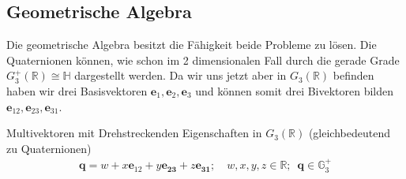 \subsection{Geometrische Algebra}
Die geometrische Algebra besitzt die Fähigkeit beide Probleme zu lösen. Die Quaternionen können, wie schon im 2 dimensionalen Fall durch die gerade Grade $G_3^+(\mathbb{R}) \cong \mathbb{H}$ dargestellt werden. Da wir uns jetzt aber in $G_3(\mathbb{R})$ befinden haben wir drei Basisvektoren $\mathbf{e}_1, \mathbf{e}_2, \mathbf{e}_3$ und können somit drei Bivektoren bilden $\mathbf{e}_{12}, \mathbf{e}_{23}, \mathbf{e}_{31}$.
\begin{definition}
	Multivektoren mit Drehstreckenden Eigenschaften in $G_3(\mathbb{R})$ (gleichbedeutend zu Quaternionen)
	\begin{align}
		\mathbf{q} = w + x\mathbf{e}_{12} + y\mathbf{e_{23}} + z\mathbf{e_{31}}; \quad w,x,y,z \in \mathbb{R};\enspace \mathbf{q} \in \mathbb{G}_3^+
	\end{align}
\end{definition}

